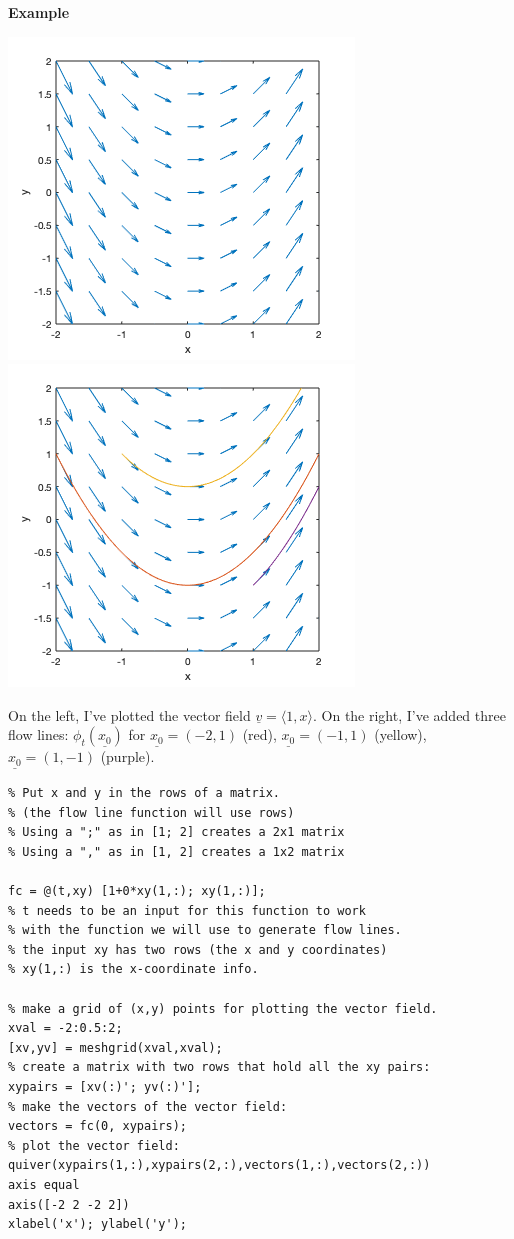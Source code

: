 \documentclass[12pt,letterpaper,noanswers]{exam}
\newcommand{\mb}[1]{\underline{#1}}
\begin{document}
\eject
\noindent\textbf{Example}

\includegraphics[width=0.45\linewidth]{img/C19vectorfield.png}
\includegraphics[width=0.45\linewidth]{img/C19vectorfieldflow.png}

On the left, I've plotted the vector field $\mb v = \langle 1, x\rangle$.  On the right, I've added three flow lines: $\phi_t(\mb{x_0})$ for $\mb{x_0} = (-2, 1)$ (red), $\mb{x_0} = (-1,1)$ (yellow), $\mb{x_0} = (1,-1)$ (purple).

\begin{lstlisting}
% Put x and y in the rows of a matrix.
% (the flow line function will use rows)
% Using a ";" as in [1; 2] creates a 2x1 matrix
% Using a "," as in [1, 2] creates a 1x2 matrix

fc = @(t,xy) [1+0*xy(1,:); xy(1,:)]; 
% t needs to be an input for this function to work
% with the function we will use to generate flow lines.
% the input xy has two rows (the x and y coordinates)
% xy(1,:) is the x-coordinate info.

% make a grid of (x,y) points for plotting the vector field.
xval = -2:0.5:2;
[xv,yv] = meshgrid(xval,xval);
% create a matrix with two rows that hold all the xy pairs:
xypairs = [xv(:)'; yv(:)'];
% make the vectors of the vector field:
vectors = fc(0, xypairs);
% plot the vector field:
quiver(xypairs(1,:),xypairs(2,:),vectors(1,:),vectors(2,:))
axis equal
axis([-2 2 -2 2])
xlabel('x'); ylabel('y');
\end{lstlisting}
\end{document}
